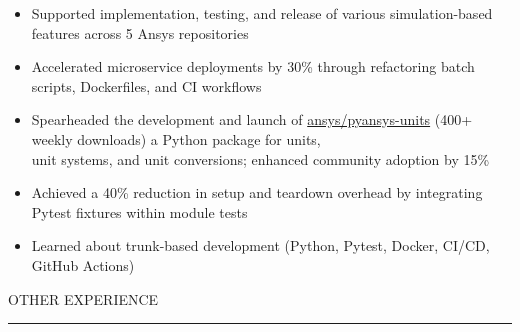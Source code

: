 \documentclass[9pt]{extarticle}
\begin{document}
\begin{adjustwidth}{10pt}{10pt}
	\begin{itemize}[topsep=0pt, labelsep=10pt, leftmargin=24pt, label=\textcolor{imptextblack}{\textbullet}]
		\item Supported implementation, testing, and release of various simulation-based features across \textcolor{imptextblack}{5} Ansys repositories
		\item Accelerated microservice deployments by \textcolor{imptextblack}{30\%} through refactoring batch scripts, Dockerfiles, and CI workflows
		\item Spearheaded the development and launch of \href{https://github.com/ansys/pyansys-units}{ansys/pyansys-units} ({\small \textcolor{imptextblack}{400+} weekly downloads}) a Python package for units, \\
			unit systems, and unit conversions; enhanced community adoption by \textcolor{imptextblack}{15\%}
		\item Achieved a \textcolor{imptextblack}{40\%} reduction in setup and teardown overhead by integrating Pytest fixtures within module tests
		\item Learned about \textcolor{imptextblack}{trunk-based} development ({\small Python, Pytest, Docker, CI/CD, GitHub Actions})
	\end{itemize}
\end{adjustwidth}

\vspace{5pt}

\begin{adjustwidth}{4pt}{4pt} \large {\selectfont OTHER EXPERIENCE} \end{adjustwidth}
\rule[8pt]{\linewidth}{0.4pt}
\end{document}
